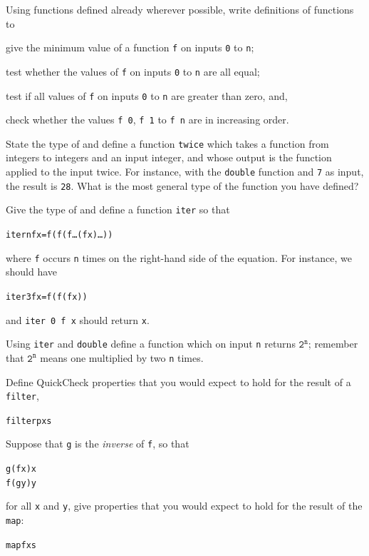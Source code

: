 \begin{exercises}
\item
Using functions defined already wherever possible, write definitions of functions to 
\begin{titemize}
\item give the minimum value of a function \texttt{f} on inputs \texttt{0} to \texttt{n};
\item test whether the values of \texttt{f} on inputs \texttt{0} to \texttt{n} are all
equal;
\item test if all values of \texttt{f} on inputs \texttt{0} to \texttt{n} are greater
than zero, and,
\item check whether the values \texttt{f 0}, \texttt{f 1} to \texttt{f n} are in
increasing order.
\end{titemize}

\item
State the type of and define a function \texttt{twice} which takes a function from integers to integers
and an input integer, and whose output is the function applied to the input
twice. For instance, with the \texttt{double} function and \texttt{7} as input,
the result is \texttt{28}. What is the most general type of the function
you have defined?

\item
Give the type of and define a function \texttt{iter} so that
\begin{alltt}
iter n f x = f (f (f \ldots (f x)\ldots))  
\end{alltt}
where \texttt{f} occurs \texttt{n} times on the right-hand side of the equation.
For instance, we should have
\begin{alltt}
iter 3 f x = f (f (f x))
\end{alltt}
and \texttt{iter 0 f x} should return \texttt{x}.

\item
Using \texttt{iter} and \texttt{double} define a function which on input \texttt{n} 
returns $\texttt{2}^{\texttt{n}}$; remember that 
$\texttt{2}^{\texttt{n}}$ means one multiplied by two \texttt{n}
times.

\item
Define QuickCheck properties that you would expect to hold for the result of a \texttt{filter},
\begin{alltt}
filter p xs
\end{alltt}

\item
Suppose that \texttt{g} is the \emph{inverse} of \texttt{f}, so that 
\begin{alltt}
g (f x) \step{}x
f (g y) \step{}y
\end{alltt}
for all \texttt{x} and \texttt{y}, give properties that you would expect to hold for the result of the \texttt{map}:
\begin{alltt}
map f xs
\end{alltt}

\end{exercises}

